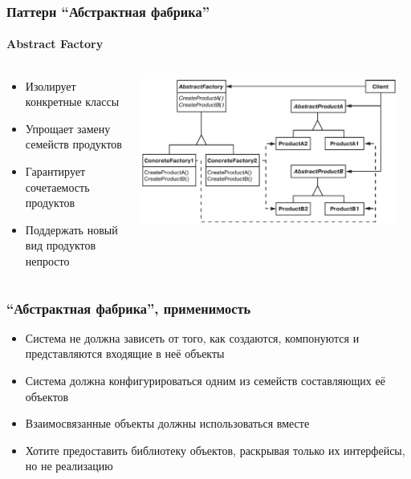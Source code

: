 \documentclass{../../slides-style}
\begin{document}
    \begin{frame}
        \frametitle{Паттерн ``Абстрактная фабрика''}
        \framesubtitle{Abstract Factory}
        \begin{columns}
            \begin{column}{0.4\textwidth}
                \begin{itemize}
                    \item Изолирует конкретные классы
                    \item Упрощает замену семейств продуктов
                    \item Гарантирует сочетаемость продуктов
                    \item Поддержать новый вид продуктов непросто
                \end{itemize}
            \end{column}
            \begin{column}{0.6\textwidth}
                \begin{center}
                    \includegraphics[width=0.95\textwidth]{abstractFactory.png}
                \end{center}
            \end{column}
        \end{columns}
    \end{frame}

    \begin{frame}
        \frametitle{``Абстрактная фабрика'', применимость}
        \begin{itemize}
            \item Система не должна зависеть от того, как создаются, компонуются и представляются входящие в неё объекты
            \item Система должна конфигурироваться одним из семейств составляющих её объектов
            \item Взаимосвязанные объекты должны использоваться вместе
            \item Хотите предоставить библиотеку объектов, раскрывая только их интерфейсы, но не реализацию
        \end{itemize}
    \end{frame}
\end{document}
